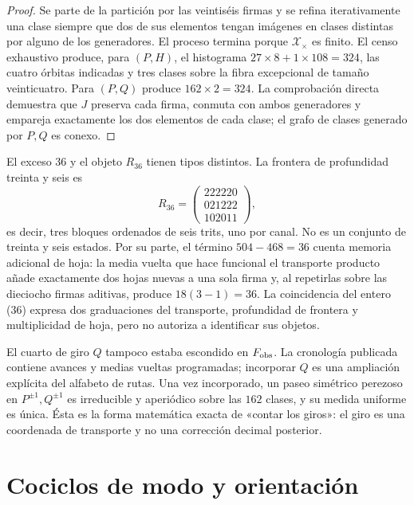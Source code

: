 \begin{proof}
Se parte de la partición por las veintiséis firmas y se refina
iterativamente una clase siempre que dos de sus elementos tengan imágenes en
clases distintas por alguno de los generadores. El proceso termina porque
\(\mathcal X_\times\) es finito. El censo exhaustivo produce, para
\((P,H)\), el histograma \(27\times8+1\times108=324\), las cuatro órbitas
indicadas y tres clases sobre la fibra excepcional de tamaño veinticuatro.
Para \((P,Q)\) produce \(162\times2=324\). La comprobación directa demuestra
que \(J\) preserva cada firma, conmuta con ambos generadores y empareja
exactamente los dos elementos de cada clase; el grafo de clases generado por
\(P,Q\) es conexo.
\end{proof}

El exceso \(36\) y el objeto \(R_{36}\) tienen tipos distintos. La frontera
de profundidad treinta y seis es
\[
 R_{36}=
 \begin{pmatrix}
 222220\\021222\\102011
 \end{pmatrix},
\]
es decir, tres bloques ordenados de seis trits, uno por canal. No es un
conjunto de treinta y seis estados. Por su parte, el término
\(504-468=36\) cuenta memoria adicional de hoja: la media vuelta que hace
funcional el transporte producto añade exactamente dos hojas nuevas a una
sola firma y, al repetirlas sobre las dieciocho firmas aditivas, produce
\(18(3-1)=36\). La coincidencia del entero (36) expresa dos graduaciones
del transporte, profundidad de frontera y multiplicidad de hoja, pero no
autoriza a identificar sus objetos.

El cuarto de giro \(Q\) tampoco estaba escondido en \(F_{\rm obs}\). La
cronología publicada contiene avances y medias vueltas programadas; incorporar
\(Q\) es una ampliación explícita del alfabeto de rutas. Una vez incorporado,
un paseo simétrico perezoso en \(P^{\pm1},Q^{\pm1}\) es irreducible y
aperiódico sobre las \(162\) clases, y su medida uniforme es única. Ésta es la
forma matemática exacta de «contar los giros»: el giro es una coordenada de
transporte y no una corrección decimal posterior.

\section{Cociclos de modo y orientación}
\label{sec:cociclos-modo-orientacion}

